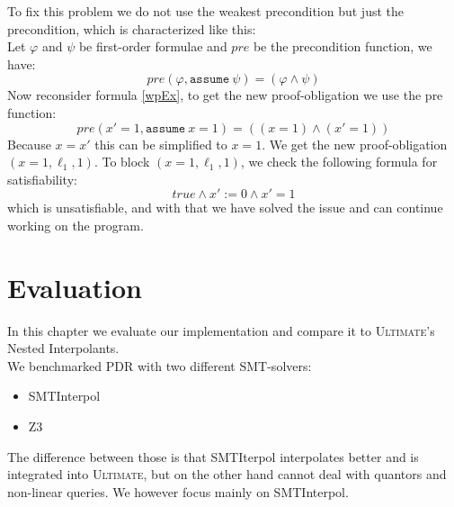 \documentclass[11pt, a4paper, BCOR=10mm, ngerman]{scrbook}
\begin{document}
To fix this problem we do not use the weakest precondition but just the precondition, which is characterized like this: \\
Let $\varphi$ and $\psi$ be first-order formulae and $pre$ be the precondition function, we have: 
\begin{equation*}
pre(\varphi, \texttt{assume}\ \psi) = (\varphi \land \psi)
\end{equation*}
Now reconsider formula \eqref{wpEx}, to get the new proof-obligation we use the pre function: 
\begin{equation*}
		pre(x' = 1, \texttt{assume}\ x = 1) = ((x = 1) \land (x' = 1))
\end{equation*}
Because $x = x'$ this can be simplified to $x = 1$. We get the new proof-obligation $(x = 1, \ell_1, 1)$.
To block $(x = 1, \ell_1, 1)$, we check the following formula for satisfiability: 
\begin{equation*}
true\land x' := 0 \land x' = 1
\end{equation*}
which is unsatisfiable, and with that we have solved the issue and can continue working on the program. \par


\chapter{Evaluation}
In this chapter we evaluate our implementation and compare it to \textsc{Ultimate}'s Nested Interpolants. \\
We benchmarked PDR with two different SMT-solvers: 
\begin{itemize}
\item SMTInterpol \cite{Zitat03}
\item Z3 \cite{Zitat04}
\end{itemize}
The difference between those is that SMTIterpol interpolates better and is integrated into \textsc{Ultimate}, but on the other hand cannot deal with quantors and non-linear queries. We however focus mainly on SMTInterpol.
\end{document}
